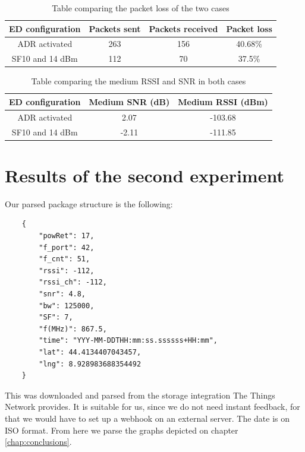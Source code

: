 \begin{table}[htpb]
    \centering
    \setlength{\arrayrulewidth}{0.5mm}
    \setlength{\tabcolsep}{18pt}
    \renewcommand{\arraystretch}{2}
    \begin{tabular}{|c|c|c|c|}
        \hline
         \cellcolor[HTML]{85C1E9}ED configuration & \cellcolor[HTML]{85C1E9}Packets sent & \cellcolor[HTML]{85C1E9}Packets received & \cellcolor[HTML]{85C1E9}Packet loss\\
         \hline
         ADR activated & 263 & 156 & 40.68\% \\
         SF10 and 14 dBm & 112 & 70 & 37.5\% \\
         \hline
    \end{tabular}
    \caption{Table comparing the packet loss of the two cases}
    \label{tab:packet_loss_exp1}
\end{table}

\begin{table}[htbp]
    \centering
    \setlength{\arrayrulewidth}{0.5mm}
    \setlength{\tabcolsep}{18pt}
    \renewcommand{\arraystretch}{2}
    \begin{tabular}{|c|c|c|}
        \hline
         \cellcolor[HTML]{85C1E9}ED configuration & \cellcolor[HTML]{85C1E9}Medium SNR (dB) & \cellcolor[HTML]{85C1E9}Medium RSSI (dBm)\\
         \hline
         ADR activated & 2.07 & -103.68 \\
         SF10 and 14 dBm & -2.11 & -111.85 \\
         \hline
    \end{tabular}
    \caption{Table comparing the medium RSSI and SNR in both cases}
    \label{tab:RSSI_SNR_exp1}
\end{table}


\section{Results of the second experiment}

Our parsed package structure is the following:

\begin{verbatim}
    {
        "powRet": 17,
        "f_port": 42,
        "f_cnt": 51,
        "rssi": -112,
        "rssi_ch": -112,
        "snr": 4.8,
        "bw": 125000,
        "SF": 7,
        "f(MHz)": 867.5,
        "time": "YYY-MM-DDTHH:mm:ss.ssssss+HH:mm",
        "lat": 44.4134407043457,
        "lng": 8.928983688354492
    }
\end{verbatim}
This was downloaded and parsed from the storage integration The Things Network provides.
It is suitable for us, since we do not need instant feedback, for that we would have to 
set up a webhook on an external server. The date is on ISO format. 
From here we parse the graphs depicted on chapter \ref{chap:conclusions}.

